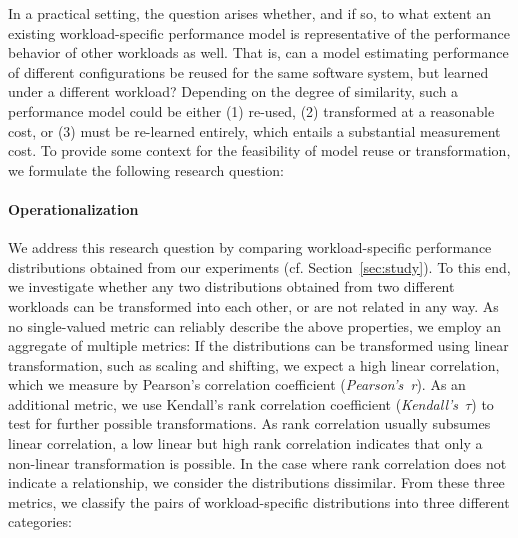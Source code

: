
In a practical setting, the question arises whether, and if so, to what extent an existing workload-specific performance model is representative of the performance behavior of other workloads as well. 
That is, can a model estimating performance of different configurations be reused for the same software system, but learned under a different workload?
Depending on the degree of similarity, such a performance model could be either (1) re-used, (2) transformed at a reasonable cost, or (3) must be re-learned entirely, which entails a substantial measurement cost. To provide some context for the feasibility of model reuse or transformation, we formulate the following research question: 


\paragraph*{Operationalization}
We address this research question by comparing workload-specific performance distributions obtained from our experiments (cf. Section~\ref{sec:study}). To this end, we investigate whether any two distributions obtained from two different workloads can be transformed into each other, or are not related in any way. As no single-valued metric can reliably describe the above properties, we employ an aggregate of multiple metrics: 
If the distributions can be transformed using linear transformation, such as scaling and shifting, we expect a high linear correlation, which we measure by Pearson’s correlation coefficient (\emph{Pearson's~r}). As an additional metric, we use Kendall’s rank correlation coefficient (\emph{Kendall's~$\tau$}) to test for further possible transformations. As rank correlation usually subsumes linear correlation, a low linear but high rank correlation indicates that only a non-linear transformation is possible. In the case where rank correlation does not indicate a relationship, we consider the distributions dissimilar. From these three metrics, we classify the pairs of workload-specific distributions into three different categories:
\vspace{1mm}

